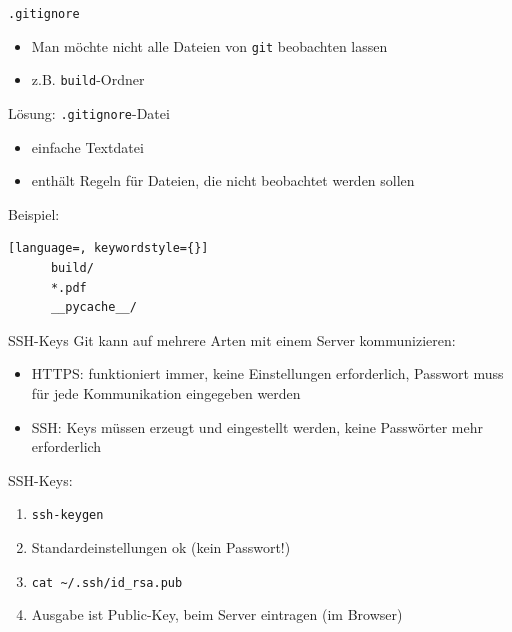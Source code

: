 \begin{frame}[fragile]{\texttt{.gitignore}}
    \begin{itemize}
    \item Man möchte nicht alle Dateien von \texttt{git} beobachten lassen
    \item z.B. \texttt{build}-Ordner
    \end{itemize}
    \begin{center}
        \Large Lösung: \texttt{.gitignore}-Datei
    \end{center}

    \begin{itemize}
    \item einfache Textdatei
    \item enthält Regeln für Dateien, die nicht beobachtet werden sollen
    \end{itemize}
    Beispiel:
    \vspace{1em}
    \begin{lstlisting}[language=, keywordstyle={}]
      build/
      *.pdf
      __pycache__/
    \end{lstlisting}
\end{frame}

\begin{frame}{SSH-Keys}
  Git kann auf mehrere Arten mit einem Server kommunizieren:
  \begin{itemize}
    \item HTTPS: funktioniert immer, keine Einstellungen erforderlich, Passwort muss für jede Kommunikation eingegeben werden
    \item SSH: Keys müssen erzeugt und eingestellt werden, keine Passwörter mehr erforderlich
  \end{itemize}

  SSH-Keys:
  \begin{enumerate}
    \item \texttt{ssh-keygen}
    \item Standardeinstellungen ok (kein Passwort!)
    \item \texttt{cat \textasciitilde/.ssh/id\_rsa.pub}
    \item Ausgabe ist Public-Key, beim Server eintragen (im Browser)
  \end{enumerate}
\end{frame}

